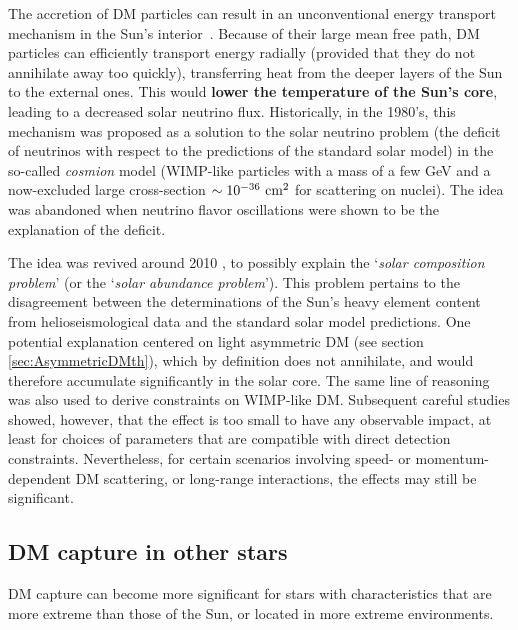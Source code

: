 \medskip

The accretion of 
DM particles can result in
an unconventional energy transport mechanism 
in the Sun's interior~\cite{DMinsun1}. 
Because of their large mean free path, DM particles can efficiently transport energy radially (provided that they do not annihilate away too quickly), transferring heat from the deeper layers of the Sun to the external ones. This would {\bf lower the temperature of the Sun's core}, leading to a decreased solar neutrino flux. 
Historically, in the 1980's, this mechanism was  proposed as a solution to the solar neutrino problem (the deficit of neutrinos with respect to the predictions of the standard solar model) in the so-called {\em cosmion} model (WIMP-like particles with a mass of a few GeV and a now-excluded large cross-section $\sim 10^{-36} \ {\rm cm}^2$ for scattering on nuclei). The idea was abandoned when neutrino flavor oscillations were shown to be the explanation of the deficit. 


The idea was revived around 2010 \cite{DMinsun2}, to possibly explain the
 `{\em solar composition problem}'  (or the `{\em solar abundance problem}').
  This problem pertains to the disagreement between the determinations of the Sun's heavy element content from helioseismological data and the standard solar model predictions.
 One potential explanation centered on light asymmetric DM (see section \ref{sec:AsymmetricDMth}), which by definition does not annihilate, and would therefore accumulate significantly in the solar core. The same line of reasoning was also used to derive constraints on WIMP-like DM.
Subsequent careful studies showed, however, that the effect is too small to have any observable impact, at least for choices of parameters that are compatible with direct detection constraints. 
Nevertheless, for certain scenarios involving speed- or momentum-dependent DM scattering, or long-range interactions, the effects may still be significant.


\subsection{DM capture in other stars}\label{sec:CaptureStars}

DM capture can become more significant for stars with characteristics that are more extreme than those of the Sun, or located in more extreme environments. 

\smallskip


